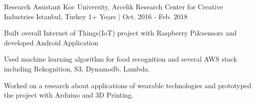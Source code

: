 \begin{cventries}
\vspace{-2mm}
  \cventry
    {Research Assistant} %
    {Koc University, Arcelik Research Center for Creative Industries} %
    {Istanbul, Turkey} %
    {1+ Years | Oct. 2016 - Feb. 2018} %
    {
      \begin{cvitems} %
       	\item {Built overall Internet of Things(IoT) project with Raspberry Pi\&sensors and developed Android Application}
       	\item {Used machine learning algorithm for food recognition and several AWS stack including Rekognition, S3, Dynamodb, Lambda.} 
         \item {Worked on a research about applications of wearable technologies and prototyped the project with Arduino and 3D Printing.  }
      \end{cvitems}
    }
\begin{comment}
  \cventry
    {Work \& Study} %
    {Koc University, Computer Information Technology Department} %
    {Istanbul, Turkey} %
    {OCt. 2015 - May. 2016} %
    {
      \begin{cvitems} %
        \item {Applied and tested Google Cloud technologies across the campus.}
      \end{cvitems}
    }
  \cventry
  {Web Application}
  {Personal Project - ku-bookshare.github.io} %
    {} %
    {3+ Months | Mar. 2019 - Present} %
    {
      \begin{cvitems} %
      	\item {Developing React web application which users can donate or borrow books from the shelves among KU campus. } 
      \end{cvitems}
    }

\end{comment}
\end{cventries}

